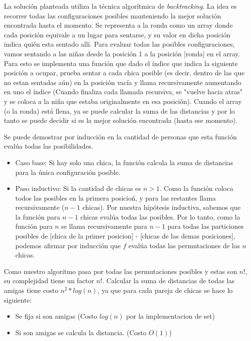 La soluci\'on planteada utiliza la t\'ecnica algor\'itmica de \textit{backtracking}. La idea es recorrer todas las configuraciones posibles manteniendo la mejor soluci\'on encontrada hasta el momento. 
Se representa a la ronda como un array donde cada posici\'on equivale a un lugar para sentarse, y su valor en dicha posici\'on indica qui\'en esta sentado all\'i. Para evaluar todas las posibles configuraciones, vamos sentando a las niñas desde la posici\'on 1 a la posici\'on |ronda| en el array. Para esto se implementa una funci\'on que dado el \'indice que indica la siguiente posici\'on a ocupar, prueba sentar a cada chica posible (es decir, dentro de las que no estan sentadas a\'un) en la posici\'on vac\'ia y llama recursivamente aumentando en uno el \'indice (Cuando finaliza cada llamada recursiva, se "vuelve hacia atras" y se coloca a la niña que estaba originalmente en esa posici\'on). Cuando el array (o la ronda) est\'a llena, ya se puede calcular la suma de las distancias y por lo tanto se puede decidir si es la mejor soluci\'on encontrada (hasta ese momento).

Se puede demostrar por inducci\'on en la cantidad de personas que esta funci\'on eval\'ua todas las posibilidades. 
\begin{itemize}
\item Caso base: Si hay solo una chica, la funci\'on calcula la suma de distancias para la \'unica configuraci\'on posible.
\item Paso inductivo: Si la cantidad de chicas es $n > 1$. Como la funci\'on coloca todos las posibles en la primera posicio\'n, y para las restantes llama recursivamente ($n-1$ chicas). Por nuestra hip\'otesis inductiva, sabemos que la funci\'on para $n-1$ chicas eval\'ua todas las posibles. Por lo tanto, como la funci\'on para $n$ se llama recursivamente para $n-1$ para todas las particiones posibles de [chica de la primer posicion] - [chicas de las demas posiciones], podemos afirmar por inducci\'on que $f$ eval\'ua todas las permutaciones de las $n$ chicas.
\end{itemize}

Como nuestro algoritmo pasa por todas las permutaciones posibles y estas son $n!$, su complejidad tiene un factor $n!$.
Calcular la suma de distancias de todas las amigas tiene costo $n^2 * log(n)$, ya que para cada pareja de chicas se hace lo siguiente:

\begin{itemize}
\item Se fija si son amigas (Costo $log(n)$ por la implementacion de set)
\item Si son amigas se calcula la distancia. (Costo $O(1)$)
\end{itemize}

